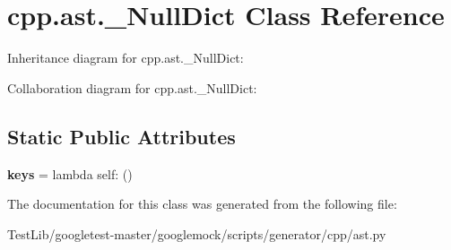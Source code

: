 \hypertarget{classcpp_1_1ast_1_1__NullDict}{}\section{cpp.\+ast.\+\_\+\+Null\+Dict Class Reference}
\label{classcpp_1_1ast_1_1__NullDict}


Inheritance diagram for cpp.\+ast.\+\_\+\+Null\+Dict\+:


Collaboration diagram for cpp.\+ast.\+\_\+\+Null\+Dict\+:
\subsection*{Static Public Attributes}
\begin{DoxyCompactItemize}
\item 
\mbox{\label{classcpp_1_1ast_1_1__NullDict_abb0b7884aa59bede0a8503dffcd1733f}} 
{\bfseries keys} = lambda self\+: ()
\end{DoxyCompactItemize}


The documentation for this class was generated from the following file\+:\begin{DoxyCompactItemize}
\item 
Test\+Lib/googletest-\/master/googlemock/scripts/generator/cpp/ast.\+py\end{DoxyCompactItemize}

